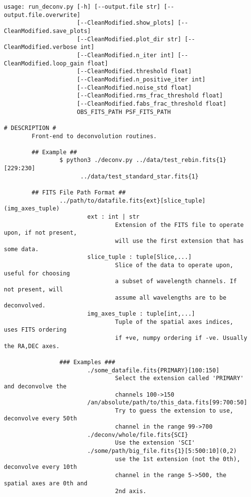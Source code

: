 \begingroup
\small
\begin{verbatim}
usage: run_deconv.py [-h] [--output.file str] [--output.file.overwrite]
                     [--CleanModified.show_plots] [--CleanModified.save_plots]
                     [--CleanModified.plot_dir str] [--CleanModified.verbose int]
                     [--CleanModified.n_iter int] [--CleanModified.loop_gain float]
                     [--CleanModified.threshold float]
                     [--CleanModified.n_positive_iter int]
                     [--CleanModified.noise_std float]
                     [--CleanModified.rms_frac_threshold float]
                     [--CleanModified.fabs_frac_threshold float]
                     OBS_FITS_PATH PSF_FITS_PATH

# DESCRIPTION #
        Front-end to deconvolution routines.

        ## Example ##
                $ python3 ./deconv.py ../data/test_rebin.fits{1}[229:230] 
                      ../data/test_standard_star.fits{1}

        ## FITS File Path Format ##
                ../path/to/datafile.fits{ext}[slice_tuple](img_axes_tuple)
                        ext : int | str
                                Extension of the FITS file to operate upon, if not present,
                                will use the first extension that has some data.
                        slice_tuple : tuple[Slice,...]
                                Slice of the data to operate upon, useful for choosing
                                a subset of wavelength channels. If not present, will
                                assume all wavelengths are to be deconvolved.
                        img_axes_tuple : tuple[int,...]
                                Tuple of the spatial axes indices, uses FITS ordering
                                if +ve, numpy ordering if -ve. Usually the RA,DEC axes.

                ### Examples ###
                        ./some_datafile.fits{PRIMARY}[100:150]
                                Select the extension called 'PRIMARY' and deconvolve the 
                                channels 100->150
                        /an/absolute/path/to/this_data.fits[99:700:50]
                                Try to guess the extension to use, deconvolve every 50th 
                                channel in the range 99->700
                        ./deconv/whole/file.fits{SCI}
                                Use the extension 'SCI'
                        ./some/path/big_file.fits{1}[5:500:10](0,2)
                                use the 1st extension (not the 0th), deconvolve every 10th 
                                channel in the range 5->500, the spatial axes are 0th and 
                                2nd axis.



\end{verbatim}
